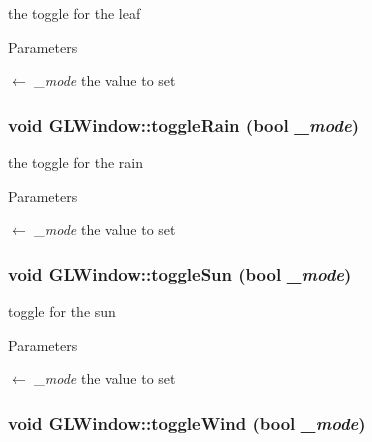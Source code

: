 the toggle for the leaf 
\begin{DoxyParams}{Parameters}
\item[\mbox{$\leftarrow$} {\em \_\-mode}]the value to set \end{DoxyParams}
\hypertarget{classGLWindow_a9d5345d6c524c26f3d9e275215e2114a}{
\subsubsection[{toggleRain}]{\setlength{\rightskip}{0pt plus 5cm}void GLWindow::toggleRain (bool {\em \_\-mode})}}
\label{classGLWindow_a9d5345d6c524c26f3d9e275215e2114a}


the toggle for the rain 
\begin{DoxyParams}{Parameters}
\item[\mbox{$\leftarrow$} {\em \_\-mode}]the value to set \end{DoxyParams}
\hypertarget{classGLWindow_aeedee6984783d525d457f61c6f83ee94}{
\subsubsection[{toggleSun}]{\setlength{\rightskip}{0pt plus 5cm}void GLWindow::toggleSun (bool {\em \_\-mode})}}
\label{classGLWindow_aeedee6984783d525d457f61c6f83ee94}


toggle for the sun 
\begin{DoxyParams}{Parameters}
\item[\mbox{$\leftarrow$} {\em \_\-mode}]the value to set \end{DoxyParams}
\hypertarget{classGLWindow_a952711eae2feee75a9b0cef3fe5ee319}{
\subsubsection[{toggleWind}]{\setlength{\rightskip}{0pt plus 5cm}void GLWindow::toggleWind (bool {\em \_\-mode})}}
\label{classGLWindow_a952711eae2feee75a9b0cef3fe5ee319}


